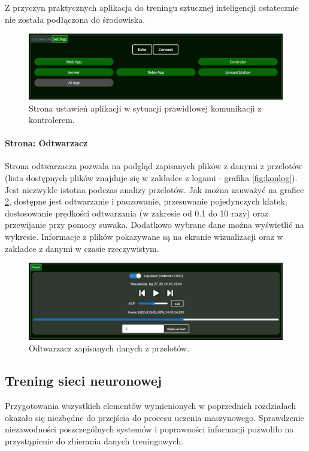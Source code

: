 \documentclass[12pt, a4paper]{article}
\begin{document}
Z przyczyn praktycznych aplikacja do treningu sztucznej inteligencji ostatecznie nie została podłączona do środowiska.

 \begin{figure}[H]
    \centering
    \includegraphics[width=1\textwidth]{settings}
    \caption{Strona ustawień aplikacji w sytuacji prawidłowej komunikacji z kontrolerem.}
    \label{fig:settings}
\end{figure}

\paragraph{Strona: Odtwarzacz}\mbox{}

Strona odtwarzacza pozwala na podgląd zapisanych plików z danymi z przelotów (lista dostępnych plików znajduje się w zakładce z logami - grafika \ref{fig:konlog}). Jest niezwykle istotna podczas analizy przelotów. Jak można zauważyć na grafice \ref{fig:player}, dostępne jest odtwarzanie i pauzowanie, przesuwanie pojedynczych klatek, dostosowanie prędkości odtwarzania (w zakresie od 0.1 do 10 razy) oraz przewijanie przy pomocy suwaka. Dodatkowo wybrane dane można wyświetlić na wykresie. Informacje z plików pokazywane są na ekranie wizualizacji oraz w zakładce z danymi w czasie rzeczywistym.

 \begin{figure}[H]
    \centering
    \includegraphics[width=1\textwidth]{player}
    \caption{Odtwarzacz zapisanych danych z przelotów.}
    \label{fig:player}
\end{figure}

\FloatBarrier
\subsection{Trening sieci neuronowej}
Przygotowania wszystkich elementów wymienionych w poprzednich rozdziałach okazało się niezbędne do przejścia do procesu uczenia maszynowego. Sprawdzenie niezawodności poszczególnych systemów i poprawności informacji pozwoliło na przystąpienie do zbierania danych treningowych.
\end{document}
